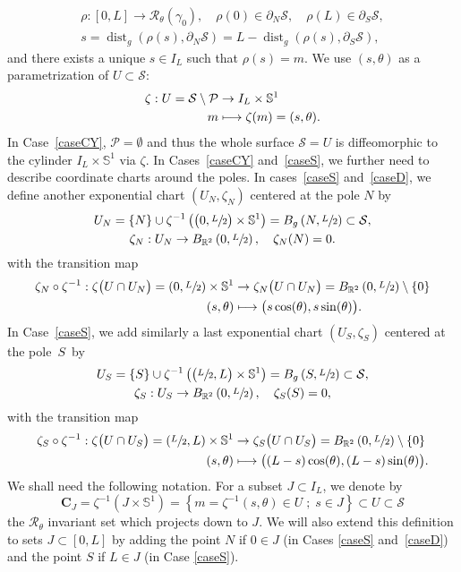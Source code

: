 \documentclass[11pt]{article}
\numberwithin{equation}{section}
\newcommand\mto{\mathchoice{\longmapsto}{\mapsto}{\mapsto}{\mapsto}}
\newcommand{\sep}{\;;\;}
\theoremstyle{definition}
\newcommand{\calR}{\ensuremath{\mathcal R}}
\renewcommand{\P}{\ensuremath{\mathcal P}}
\newcommand{\calS}{\ensuremath{\mathcal S}}
\newcommand{\mb}[1]{\ensuremath{\mathbb{#1}}}
\newcommand{\R}{{\mb{R}}}
\newcommand{\bS}{\ensuremath{\mathbb S}}
\DeclareMathOperator{\dist}{dist}
\let\d\partial
\newcommand\CO[1]{\boldsymbol{C}_{\!#1}}
\begin{document}
\begin{gather*}
\rho : [0,L]\to \calR_\theta (\gamma_0), \quad \rho (0) \in \d_N \calS, \quad \rho (L) \in \d_S \calS, \\
s = \dist_g( \rho(s), \d_N \calS) = L- \dist_g( \rho(s), \d_S \calS),
\end{gather*}
and there exists a unique $s \in I_L$ such that $\rho(s) = m$. We use $(s,\theta)$ as a parametrization of $U \subset \calS$:
\begin{align*}
\zeta : U = \mathcal{S} \setminus \P& \to I_L \times \bS^1\\
m& \mto \zeta(m) = (s, \theta).
\end{align*}
In Case~\ref{caseCY}, $\P=\emptyset$ and thus the whole surface $\calS = U$ is diffeomorphic to the cylinder $I_L \times \bS^1$ via $\zeta$.
In Cases~\ref{caseCY} and~\ref{caseS}, we further need to describe coordinate charts around the poles.
In cases~\ref{caseS} and~\ref{caseD}, we define another exponential chart $(U_N, \zeta_N)$ centered at the pole $N$ by
\begin{gather*}
U_N = \{N\} \cup \zeta^{-1} \left( \big( 0, \sfrac{L}{2} \big) \times \bS^1 \right) = B_g\left(N, \sfrac{L}{2}\right) \subset \calS,
\\ \zeta_N : U_N \to B_{\R^2}\left(0, \sfrac{L}{2}\right), \quad \zeta_N (N) = 0.
\end{gather*}
with the transition map
\begin{align*}
\zeta_N \circ \zeta^{-1} : \zeta \big(U\cap U_N \big) = \left( 0,\sfrac{L}{2} \right) \times \bS^1 & \to \zeta_N \big(U\cap U_N \big) = B_{\R^2}\left(0, \sfrac{L}{2}\right) \setminus \{ 0 \}\\
(s,\theta)& \mto \big(s \cos(\theta), s \sin (\theta) \big).
\end{align*}
In Case~\ref{caseS}, we add similarly a last exponential chart $(U_S, \zeta_S)$ centered at the pole~$S$~by
\begin{gather*}
U_S = \{S\} \cup \zeta^{-1} \left( \big( \sfrac{L}{2}, L \big) \times \bS^1 \right) = B_g\left(S, \sfrac{L}{2}\right) \subset \calS,
\\ \zeta_S : U_S \to B_{\R^2}\left(0, \sfrac{L}{2}\right), \quad \zeta_S (S) = 0,
\end{gather*}
with the transition map
\begin{align*}
\zeta_S \circ \zeta^{-1} : \zeta \big(U\cap U_S \big) = \left(\sfrac{L}{2}, L \right) \times \bS^1 & \to \zeta_S \big(U\cap U_S \big) = B_{\R^2}\left(0, \sfrac{L}{2}\right) \setminus \{ 0 \}\\
(s,\theta)& \mto \big((L-s) \cos(\theta), (L-s) \sin (\theta) \big).
\end{align*}
We shall need the following notation. For a subset $J\subset I_L$, we denote by
\[
\CO{J}=\zeta^{-1}(J\times\bS^1) = \left\{m=\zeta^{-1}(s,\theta)\in U\sep s\in J\right\} \subset U\subset \calS
\]
the $\calR_\theta$ invariant set which projects down to $J$.
We will also extend this definition to sets $J\subset [0,L]$ by adding the point $N$ if $0\in J$ (in Cases \ref{caseS} and~\ref{caseD}) and the point $S$ if $L\in J$ (in Case \ref{caseS}).
\end{document}
